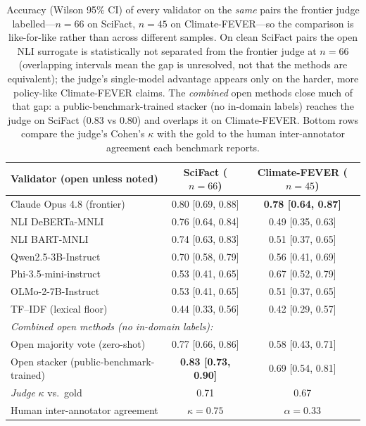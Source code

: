 \begin{table}[t]
\centering
\caption{Accuracy (Wilson 95\% CI) of every validator on the \emph{same} pairs the frontier judge
labelled---$n=66$ on SciFact, $n=45$ on Climate-FEVER---so the comparison is like-for-like rather than
across different samples. On clean SciFact pairs the open NLI surrogate is statistically
not separated from the frontier judge at $n{=}66$ (overlapping intervals mean the gap is unresolved,
not that the methods are equivalent); the judge's single-model advantage appears only
on the harder, more policy-like Climate-FEVER claims. The \emph{combined} open methods close much of that
gap: a public-benchmark-trained stacker (no in-domain labels) reaches the judge on SciFact (0.83 vs 0.80)
and overlaps it on Climate-FEVER. Bottom rows compare the judge's Cohen's $\kappa$ with the gold to the
human inter-annotator agreement each benchmark reports.}
\label{tab:validation}
\begin{tabular}{lcc}
\toprule
Validator (open unless noted) & SciFact ($n{=}66$) & Climate-FEVER ($n{=}45$) \\
\midrule
Claude Opus 4.8 (frontier)  & 0.80 [0.69, 0.88] & \textbf{0.78 [0.64, 0.87]} \\
NLI DeBERTa-MNLI       & 0.76 [0.64, 0.84] & 0.49 [0.35, 0.63] \\
NLI BART-MNLI          & 0.74 [0.63, 0.83] & 0.51 [0.37, 0.65] \\
Qwen2.5-3B-Instruct    & 0.70 [0.58, 0.79] & 0.56 [0.41, 0.69] \\
Phi-3.5-mini-instruct  & 0.53 [0.41, 0.65] & 0.67 [0.52, 0.79] \\
OLMo-2-7B-Instruct     & 0.53 [0.41, 0.65] & 0.51 [0.37, 0.65] \\
TF--IDF (lexical floor) & 0.44 [0.33, 0.56] & 0.42 [0.29, 0.57] \\
\midrule
\multicolumn{3}{l}{\emph{Combined open methods (no in-domain labels):}}\\
\quad Open majority vote (zero-shot) & 0.77 [0.66, 0.86] & 0.58 [0.43, 0.71] \\
\quad Open stacker (public-benchmark-trained) & \textbf{0.83 [0.73, 0.90]} & 0.69 [0.54, 0.81] \\
\midrule
\emph{Judge} $\kappa$ vs.\ gold & 0.71 & 0.67 \\
Human inter-annotator agreement & $\kappa=0.75$ & $\alpha=0.33$ \\
\bottomrule
\end{tabular}
\end{table}

